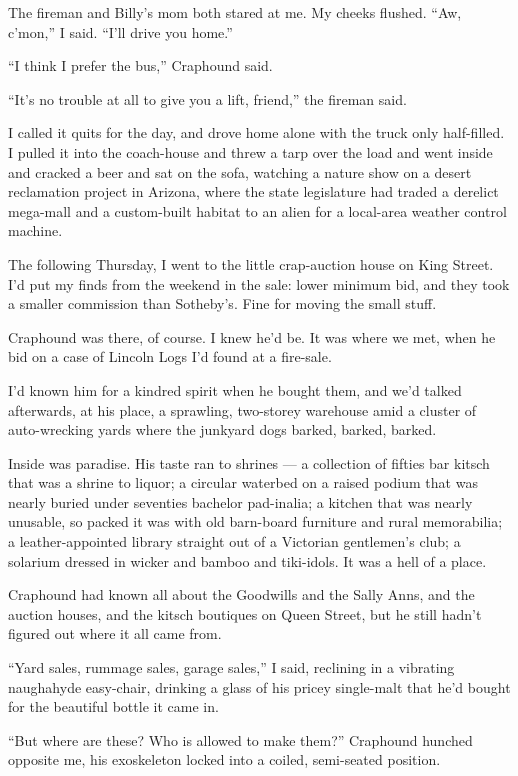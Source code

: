 The fireman and Billy's mom both stared at me. My cheeks flushed.
``Aw, c'mon,'' I said. ``I'll drive you home.''

``I think I prefer the bus,'' Craphound said.

``It's no trouble at all to give you a lift, friend,'' the fireman
said.

I called it quits for the day, and drove home alone with the truck
only half-filled. I pulled it into the coach-house and threw a tarp
over the load and went inside and cracked a beer and sat on the
sofa, watching a nature show on a desert reclamation project in
Arizona, where the state legislature had traded a derelict
mega-mall and a custom-built habitat to an alien for a local-area
weather control machine.

\tb

The following Thursday, I went to the little crap-auction house on
King Street. I'd put my finds from the weekend in the sale: lower
minimum bid, and they took a smaller commission than Sotheby's.
Fine for moving the small stuff.

Craphound was there, of course. I knew he'd be. It was where we
met, when he bid on a case of Lincoln Logs I'd found at a
fire-sale.

I'd known him for a kindred spirit when he bought them, and we'd
talked afterwards, at his place, a sprawling, two-storey warehouse
amid a cluster of auto-wrecking yards where the junkyard dogs
barked, barked, barked.

Inside was paradise. His taste ran to shrines --- a collection of
fifties bar kitsch that was a shrine to liquor; a circular waterbed
on a raised podium that was nearly buried under seventies bachelor
pad-inalia; a kitchen that was nearly unusable, so packed it was
with old barn-board furniture and rural memorabilia; a
leather-appointed library straight out of a Victorian gentlemen's
club; a solarium dressed in wicker and bamboo and tiki-idols. It
was a hell of a place.

Craphound had known all about the Goodwills and the Sally Anns, and
the auction houses, and the kitsch boutiques on Queen Street, but
he still hadn't figured out where it all came from.

``Yard sales, rummage sales, garage sales,'' I said, reclining in a
vibrating naughahyde easy-chair, drinking a glass of his pricey
single-malt that he'd bought for the beautiful bottle it came in.

``But where are these? Who is allowed to make them?'' Craphound
hunched opposite me, his exoskeleton locked into a coiled,
semi-seated position.

